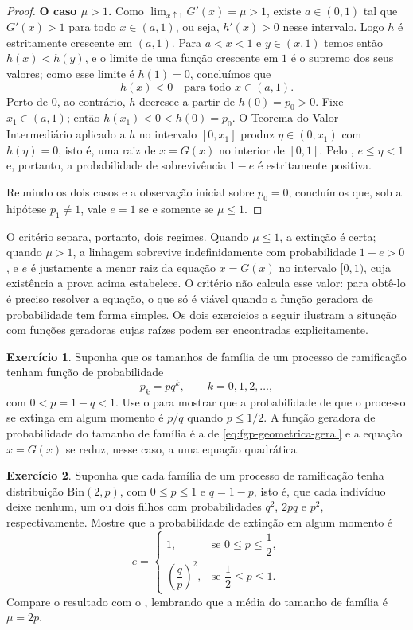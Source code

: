 \documentclass[12pt,portuguese]{article}
\theoremstyle{definition}
\theoremstyle{plainexercise}
\newtheorem{exercise}{Exercício}
\theoremstyle{starredexercise}
\theoremstyle{definition}
\begin{document}
\begin{proof}
\smallskip
\noindent\textbf{O caso $\mu>1$.}
Como $\lim_{x\uparrow1}G'(x)=\mu>1$, existe $a\in(0,1)$ tal que $G'(x)>1$ para
todo $x\in(a,1)$, ou seja, $h'(x)>0$ nesse intervalo. Logo $h$ é estritamente
crescente em $(a,1)$. Para $a<x<1$ e $y\in(x,1)$ temos então $h(x)<h(y)$, e o
limite de uma função crescente em $1$ é o supremo dos seus valores; como esse
limite é $h(1)=0$, concluímos que
\[
h(x)<0
\quad\text{para todo } x\in(a,1).
\]
Perto de $0$, ao contrário, $h$ decresce a partir de $h(0)=p_0>0$. Fixe
$x_1\in(a,1)$; então $h(x_1)<0<h(0)=p_0$. O Teorema do Valor Intermediário
aplicado a $h$ no intervalo $[0,x_1]$ produz $\eta\in(0,x_1)$ com
$h(\eta)=0$, isto é, uma raiz de $x=G(x)$ no interior de $[0,1]$. Pelo
, $e\leqslant\eta<1$ e, portanto, a probabilidade de
sobrevivência $1-e$ é estritamente positiva.

\smallskip
Reunindo os dois casos e a observação inicial sobre $p_0=0$, concluímos que,
sob a hipótese $p_1\neq1$, vale $e=1$ se e somente se $\mu\leqslant1$.
\end{proof}

O critério separa, portanto, dois regimes. Quando $\mu\leqslant1$, a extinção é
certa; quando $\mu>1$, a linhagem sobrevive indefinidamente com
probabilidade $1-e>0$, e $e$ é justamente a menor raiz da equação $x=G(x)$
no intervalo $[0,1)$, cuja existência a prova acima estabelece. O critério
não calcula esse
valor: para obtê-lo é preciso resolver a equação, o que só é viável quando a
função geradora de probabilidade tem forma simples. Os dois exercícios a seguir
ilustram a situação com funções geradoras cujas raízes podem ser encontradas
explicitamente.

\begin{exercise}\label{exercise:extincao-geometrica}
Suponha que os tamanhos de família de um processo de ramificação tenham função
de probabilidade
\[
p_k=pq^k,\qquad k=0,1,2,\ldots,
\]
com $0<p=1-q<1$. Use o  para mostrar que a
probabilidade de que o processo se extinga em algum momento é $p/q$ quando
$p\leqslant1/2$. A função geradora de probabilidade do tamanho de família é a de
\eqref{eq:fgp-geometrica-geral} e a equação $x=G(x)$ se reduz, nesse caso, a
uma equação quadrática.
\end{exercise}

\begin{exercise}\label{exercise:extincao-binomial}
Suponha que cada família de um processo de ramificação tenha distribuição
$\mathrm{Bin}(2,p)$, com $0\leqslant p\leqslant1$ e $q=1-p$, isto é, que cada
indivíduo deixe nenhum, um ou dois filhos com probabilidades $q^2$, $2pq$
e $p^2$,
respectivamente. Mostre que a probabilidade de extinção em algum momento é
\[
e=
\begin{cases}
1, & \text{se } 0\leqslant p\leqslant\dfrac{1}{2},\\[0.3cm]
\left(\dfrac{q}{p}\right)^{2}, & \text{se } \dfrac{1}{2}\leqslant p\leqslant1.
\end{cases}
\]
Compare o resultado com o , lembrando que a média
do tamanho de família é $\mu=2p$.
\end{exercise}
\end{document}
